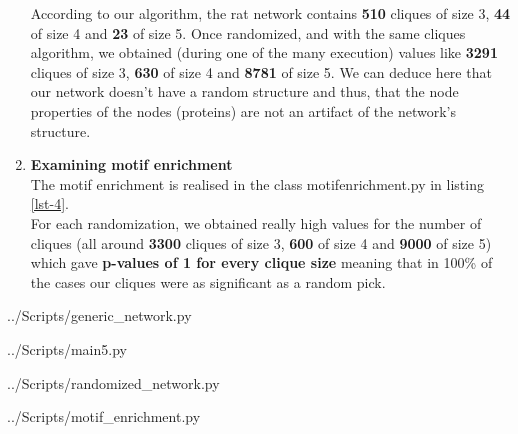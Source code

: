 \documentclass[10pt,a4paper]{article}
\begin{document}
\begin{enumerate}
According to our algorithm, the rat network contains \textbf{510} cliques of size 3, \textbf{44} of size 4 and \textbf{23} of size 5. Once randomized, and with the same cliques algorithm, we obtained (during one of the many execution) values like \textbf{3291} cliques of size 3, \textbf{630} of size 4 and \textbf{8781} of size 5. We can deduce here that our network doesn't have a random structure and thus, that the node properties of the nodes (proteins) are not an artifact of the network's structure.  




\item \textbf{Examining motif enrichment}\\
The motif enrichment is realised in the class motif\textunderscore enrichment.py in listing \ref{lst-4}. \\

For each randomization, we obtained really high values for the number of cliques (all around \textbf{3300} cliques of size 3, \textbf{600} of size 4 and \textbf{9000} of size 5) which gave \textbf{p-values of 1 for every clique size} meaning that in 100\% of the cases our cliques were as significant as a random pick. 





\end{enumerate}


\newpage
 {../Scripts/generic\string_network.py}

\newpage
 {../Scripts/main5.py}

\newpage
 {../Scripts/randomized\string_network.py}

\newpage
 {../Scripts/motif\string_enrichment.py}
\end{document}
